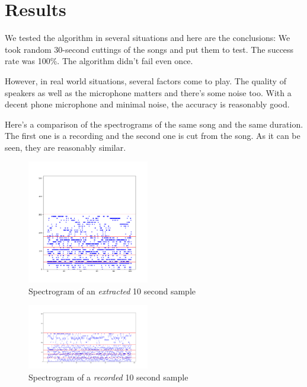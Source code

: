 \documentclass[12pt, a4paper]{IEEEtran}
\begin{document}
\section{Results}
We tested the algorithm in several situations and here are the conclusions:
We took random 30-second cuttings of the songs and put them to test. The success rate was 100\%. The algorithm didn't fail even once.
\par
However, in real world situations, several factors come to play. The quality of speakers as well as the microphone matters and there's some noise too.
With a decent phone microphone and minimal noise, the accuracy is reasonably good.
\par
Here's a comparison of the spectrograms of the same song and the same duration. The first one is a recording and the second one is cut from the song. As it can be seen, they are reasonably similar. 
\vspace{-5mm}
\begin{figure}[h]
    \begin{center}
        \includegraphics[width=0.475\textwidth]{Plot_CT.png}
    \end{center}
    \captionsetup{justification=centering}
    \caption{Spectrogram of an \textit{extracted} 10 second sample }
\end{figure}
\vspace{-10mm}
\begin{figure}[h]
    \begin{center}
        \includegraphics[width=0.475\textwidth, height=0.475\textwidth]{Cheap_Thrills.png}
    \end{center}
    \captionsetup{justification=centering}
    \caption{Spectrogram of a \textit{recorded} 10 second sample }
\end{figure}
\end{document}
